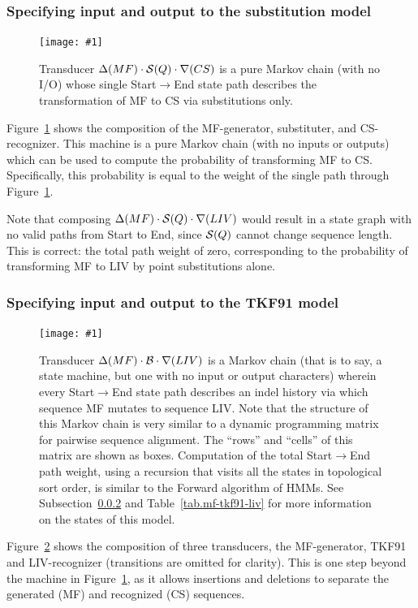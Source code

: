 \documentclass{article}
\newcommand{\secref}[1]{Subsection~\ref{sec.#1}}
\newcommand{\seclabel}[1]{\label{sec.#1}}
\newcommand{\tabnum}[1]{\ref{tab.#1}}
\newcommand{\tabref}[1]{Table~\tabnum{#1}}
\newcommand{\figref}[1]{Figure~\ref{Figures.#1}}
\newcommand{\figlabel}[1]{\label{Figures.#1}}
\newcommand{\easyfig}[4]{
\begin{figure}
\texttt{[image: \#1]}
\caption{ \figlabel{#3} #4}
\end{figure}}
\newcommand{\widepdffig}[2]{\easyfig{#1-fig.pdf}{width=\textwidth}{#1}{#2}}
\newcommand\substitute{{\cal S}}
\newcommand\tkf{{\cal B}}
\newcommand\generate{\Delta}
\newcommand\recognize{\nabla}
\begin{document}
\subsubsection{Specifying input and output to the substitution model}


\widepdffig{mf-substituter-cs}{Transducer $\generate(MF) \cdot \substitute(Q) \cdot \recognize(CS)$ is a pure Markov chain (with no I/O) whose single Start$\to$End state path describes the transformation of MF to CS via substitutions only. }

\figref{mf-substituter-cs} shows the composition of the MF-generator, substituter, and CS-recognizer.  
This machine is a pure Markov chain (with no inputs or outputs) which can be used to compute 
the probability of transforming MF to CS.
Specifically, this probability is equal to the weight of the single path through \figref{mf-substituter-cs}.

Note that composing $\generate(MF) \cdot \substitute(Q) \cdot \recognize(LIV) $
would result in a state graph with no valid paths from Start to End, since $\substitute(Q)$ cannot change sequence length.  
This is correct: the total path weight of zero, corresponding to the probability of transforming MF to LIV by point substitutions alone.  


\subsubsection{Specifying input and output to the TKF91 model}
\seclabel{mf-tkf91-liv}

\widepdffig{mf-tkf91-liv}{Transducer $\generate(MF) \cdot \tkf \cdot \recognize(LIV)$ is a Markov chain
 (that is to say, a state machine, but one with no input or output characters)
 wherein every Start$\to$End state path describes an indel history
via which sequence MF mutates to sequence LIV. Note that the structure of this Markov chain is very similar to a dynamic programming matrix for pairwise sequence alignment.
The ``rows'' and ``cells'' of this matrix are shown as boxes.
Computation of the total Start$\to$End path weight, using a recursion that visits all the states in topological sort order,
is similar to the Forward algorithm of HMMs.
See \secref{mf-tkf91-liv} and \tabref{mf-tkf91-liv} for more information on the states of this model.
}

\figref{mf-tkf91-liv} shows the composition of three transducers, the MF-generator, TKF91 and LIV-recognizer
(transitions are omitted for clarity).
This is one step beyond the machine in \figref{mf-substituter-cs}, as it allows 
insertions and deletions to separate the generated (MF) and recognized (CS) sequences.  
\end{document}
